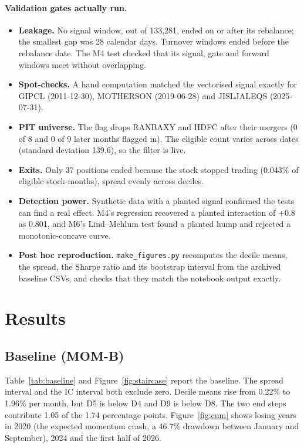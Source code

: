 \documentclass[11pt]{article}
\begin{document}
\paragraph{Validation gates actually run.}
\begin{itemize}
\item \textbf{Leakage.} No signal window, out of 133,281, ended on or after its
rebalance; the smallest gap was 28 calendar days. Turnover windows ended before the
rebalance date. The M4 test checked that its signal, gate and forward windows meet
without overlapping.
\item \textbf{Spot-checks.} A hand computation matched the vectorised signal exactly
for GIPCL (2011-12-30), MOTHERSON (2019-06-28) and JISLJALEQS (2025-07-31).
\item \textbf{PIT universe.} The flag drops RANBAXY and HDFC after their mergers (0 of 8
and 0 of 9 later months flagged in). The eligible count varies across dates (standard
deviation 139.6), so the filter is live.
\item \textbf{Exits.} Only 37 positions ended because the stock stopped trading (0.043\%
of eligible stock-months), spread evenly across deciles.
\item \textbf{Detection power.} Synthetic data with a planted signal confirmed the tests
can find a real effect. M4's regression recovered a planted interaction of $+0.8$ as
0.801, and M6's Lind--Mehlum test found a planted hump and rejected a monotonic-concave
curve.
\item \textbf{Post hoc reproduction.} \texttt{make\_figures.py} recomputes the decile
means, the spread, the Sharpe ratio and its bootstrap interval from the archived baseline
CSVs, and checks that they match the notebook output exactly.
\end{itemize}

\section{Results}

\subsection{Baseline (MOM-B)}

Table~\ref{tab:baseline} and Figure~\ref{fig:staircase} report the baseline. The spread
interval and the IC interval both exclude zero. Decile means rise from 0.22\% to 1.96\%
per month, but D5 is below D4 and D9 is below D8. The two end steps contribute 1.05 of
the 1.74 percentage points. Figure~\ref{fig:cum} shows losing years in 2020 (the
expected momentum crash, a 46.7\% drawdown between January and September), 2024 and the
first half of 2026.
\end{document}
